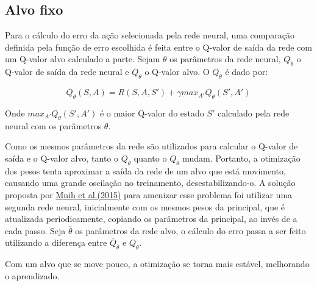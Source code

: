 
\subsection{Alvo fixo}
\label{sec:ft}

Para o cálculo do erro da ação selecionada pela rede neural, uma comparação definida pela função de erro escolhida é feita entre o Q-valor de saída da rede com um Q-valor alvo calculado a parte.
Sejam $\theta$ os parâmetros da rede neural, $Q_{\theta}$ o Q-valor de saída da rede neural e $\overline{Q}_{\theta}$ o Q-valor alvo.
O $\overline{Q}_{\theta}$ é dado por:

\begin{equation} \label{eq:q_target}
\overline{Q}_{\theta}(S,A) = R(S,A,S') + \gamma max_{A'}Q_{\theta}(S',A')
\end{equation}

Onde $max_{A'}Q_{\theta}(S',A')$ é o maior Q-valor do estado $S'$ calculado pela rede neural com os parâmetros $\theta$.

Como os mesmos parâmetros da rede são utilizados para calcular o Q-valor de saída e o Q-valor alvo, tanto o $Q_{\theta}$ quanto o $\overline{Q}_{\theta}$ mudam.
Portanto, a otimização dos pesos tenta aproximar a saída da rede de um alvo que está movimento, causando uma grande oscilação no treinamento, desestabilizando-o.
A solução proposta por \hyperlink{Mni+15}{Mnih et al.(2015)} para amenizar esse problema foi utilizar uma segunda rede neural, inicialmente com os mesmos pesos da principal, que é atualizada periodicamente, copiando os parâmetros da principal, ao invés de a cada passo.
Seja $\overline{\theta}$ os parâmetros da rede alvo, o cálculo do erro passa a ser feito utilizando a diferença entre $\overline{Q}_{\overline{\theta}}$ e $Q_{\theta}$.

Com um alvo que se move pouco, a otimização se torna mais estável, melhorando o aprendizado.
